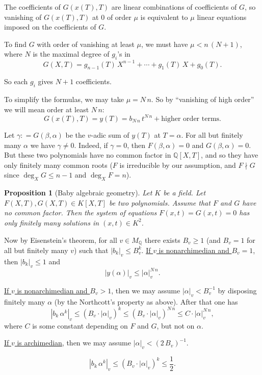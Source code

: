 \documentclass{article}
\newcommand{\dfn}{\mathrel{\mathop:}=}
\newcommand{\QQ}{\mathbb{Q}}
\theoremstyle{myplain}
\newtheorem{proposition}{Proposition}[section]
\theoremstyle{mydefinition}
\begin{document}
The coefficients of $G (x(T), T)$ are linear combinations of coefficients of
$G$, so vanishing of $G (x(T), T)$ at $0$ of order $\mu$ is equivalent to $\mu$
linear equations imposed on the coefficients of $G$.

To find $G$ with order of vanishing at least $\mu$, we must have
$\mu < n \, (N+1)$, where $N$ is the maximal degree of $g_i$'s in
\[ G (X,T) = g_{n-1} (T)\,X^{n-1} + \cdots + g_1 (T)\,X + g_0 (T). \]

So each $g_i$ gives $N+1$ coefficients.

To simplify the formulas, we may take $\mu = N\,n$. So by ``vanishing of high
order'' we will mean order at least $N\,n$:
\[ G (x(T),T) = y(T) = b_{N\,n} \, t^{N\,n} + \text{higher order terms}. \]

Let $\gamma \dfn G (\beta,\alpha)$ be the $v$-adic sum of $y (T)$ at
$T = \alpha$. For all but finitely many $\alpha$ we have $\gamma \ne 0$. Indeed,
if $\gamma = 0$, then $F (\beta,\alpha) = 0$ and $G (\beta,\alpha) = 0$. But
these two polynomials have no common factor in $\QQ [X,T]$, and so they have
only finitely many common roots ($F$ is irreducible by our assumption, and
$F \nmid G$ since $\deg_X G \le n-1$ and $\deg_X F = n$).

\begin{proposition}[Baby algebraic geometry]
  Let $K$ be a field. Let $F (X,T), G (X,T) \in K [X,T]$ be two
  polynomials. Assume that $F$ and $G$ have no common factor. Then the system of
  equations $F (x,t) = G (x,t) = 0$ has only finitely many solutions in
  $(x,t) \in K^2$.
\end{proposition}

Now by Eisenstein's theorem, for all $v \in M_\QQ$ there exists $B_v \ge 1$ (and
$B_v = 1$ for all but finitely many $v$) such that $|b_k|_v \le
B_v^k$. \underline{If $v$ is nonarchimedian and $B_v = 1$}, then $|b_k|_v \le 1$
and
$$|y (\alpha)|_v \le |\alpha|_v^{N\,n}.$$

\underline{If $v$ is nonarchimedian and $B_v > 1$}, then we may assume
$|\alpha|_v < B_v^{-1}$ by disposing finitely many $\alpha$ (by the Northcott's
property as above). After that one has
\[ |b_k \, \alpha^k|_v \le
  (B_v \cdot |\alpha|_v)^k \le
  (B_v \cdot |\alpha|_v)^{N\,n} \le
  C \cdot |\alpha|_v^{N\,n}, \]
where $C$ is some constant depending on $F$ and $G$, but not on $\alpha$.

\underline{If $v$ is archimedian}, then we may assume $|\alpha|_v < (2\,B_v)^{-1}$.

\[ |b_k \, \alpha^k|_v \le (B_v \cdot |\alpha|_v)^k \le \frac{1}{2}. \]
\end{document}
